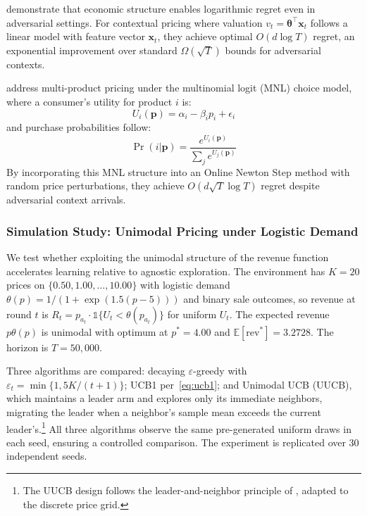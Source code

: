 \citet{Xu2021} demonstrate that economic structure enables logarithmic regret even in adversarial settings. For contextual pricing where valuation $v_t = \boldsymbol{\theta}^\top \mathbf{x}_t$ follows a linear model with feature vector $\mathbf{x}_t$, they achieve optimal $O(d \log T)$ regret, an exponential improvement over standard $\Omega(\sqrt{T})$ bounds for adversarial contexts.

\citet{Goyal2022} address multi-product pricing under the multinomial logit (MNL) choice model, where a consumer's utility for product $i$ is:
\begin{equation}
U_i(\mathbf{p}) = \alpha_i - \beta_i p_i + \epsilon_i
\end{equation}
and purchase probabilities follow:
\begin{equation}
\Pr(i|\mathbf{p}) = \frac{e^{U_i(\mathbf{p})}}{\sum_j e^{U_j(\mathbf{p})}}
\end{equation}
By incorporating this MNL structure into an Online Newton Step method with random price perturbations, they achieve $O(d\sqrt{T}\log T)$ regret despite adversarial context arrivals.

\subsubsection{Simulation Study: Unimodal Pricing under Logistic Demand}
\label{sec:sim_pricing}

We test whether exploiting the unimodal structure of the revenue function accelerates learning relative to agnostic exploration. The environment has $K = 20$ prices on $\{0.50, 1.00, \ldots, 10.00\}$ with logistic demand $\theta(p) = 1/(1 + \exp(1.5(p - 5)))$ and binary sale outcomes, so revenue at round $t$ is $R_t = p_{a_t} \cdot \mathbb{1}\{U_t < \theta(p_{a_t})\}$ for uniform $U_t$. The expected revenue $p\theta(p)$ is unimodal with optimum at $p^* = 4.00$ and $\mathbb{E}[\text{rev}^*] = 3.2728$. The horizon is $T = 50{,}000$.

Three algorithms are compared: decaying $\varepsilon$-greedy with $\varepsilon_t = \min\{1, 5K/(t+1)\}$; UCB1 per~\eqref{eq:ucb1}; and Unimodal UCB (UUCB), which maintains a leader arm and explores only its immediate neighbors, migrating the leader when a neighbor's sample mean exceeds the current leader's.\footnote{The UUCB design follows the leader-and-neighbor principle of \citet{CombesProutiere2014}, adapted to the discrete price grid.} All three algorithms observe the same pre-generated uniform draws in each seed, ensuring a controlled comparison. The experiment is replicated over 30 independent seeds.

